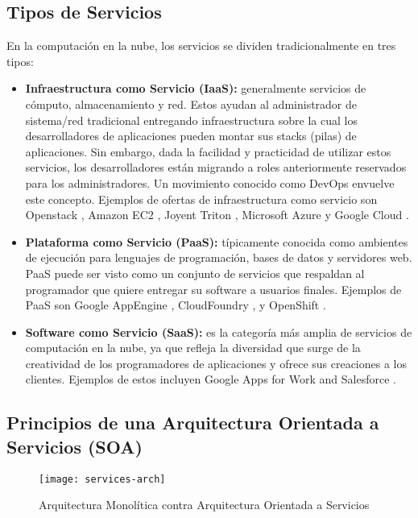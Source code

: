         \subsection{Tipos de Servicios}
        En la computación en la nube, los servicios se dividen tradicionalmente en tres tipos:
        \begin{itemize}
            \item \textbf{Infraestructura como Servicio (IaaS):} generalmente servicios de cómputo, almacenamiento y red. Estos ayudan al administrador de sistema/red tradicional entregando infraestructura sobre la cual los desarrolladores de aplicaciones pueden montar sus stacks (pilas) de aplicaciones. Sin embargo, dada la facilidad y practicidad de utilizar estos servicios, los desarrolladores están migrando a roles anteriormente reservados para los administradores. Un movimiento conocido como DevOps envuelve este concepto. Ejemplos de ofertas de infraestructura como servicio son Openstack \citeyear{Openstack2016-od}, Amazon EC2 \citeyear{Aws2016-fc}, Joyent Triton \citeyear{Joyent2016-wr}, Microsoft Azure \citeyear{Azure2016-iu} y Google Cloud \citeyear{GCloud-iu}.
            \item \textbf{Plataforma como Servicio (PaaS): }típicamente conocida como ambientes de ejecución para lenguajes de programación, bases de datos y servidores web. PaaS puede ser visto como un conjunto de servicios que respaldan al programador que quiere entregar su software a usuarios finales. Ejemplos de PaaS son Google AppEngine \citeyear{Google2016-zb}, CloudFoundry \citeyear{Cloudfoundry2016-vz}, y OpenShift \citeyear{RedHat2016-sb}.
            \item \textbf{Software como Servicio (SaaS):} es la categoría más amplia de servicios de computación en la nube, ya que refleja la diversidad que surge de la creatividad de los programadores de aplicaciones y ofrece sus creaciones a los clientes. Ejemplos de estos incluyen Google Apps for Work \citeyear{Google2016-ts} and Salesforce \citeyear{Salesforce2016-mo}.
        \end{itemize}

        \subsection{Principios de una Arquitectura Orientada a Servicios (SOA)}
        
    \begin{figure}[H]
        \centering
        \texttt{[image: services-arch]}
        \caption{Arquitectura Monolítica contra Arquitectura Orientada a Servicios \protect\cite{Fox2013-ct}}
        \label{fig:services-arch}
    \end{figure}
        
